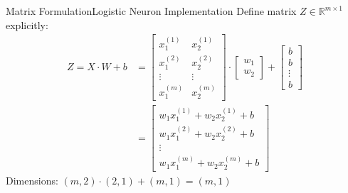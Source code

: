 \documentclass[aspectratio=169]{beamer}
\begin{document}
%
%
\begin{frame}{Matrix Formulation}{Logistic Neuron Implementation}
Define matrix $Z \in \mathbb{R}^{m \times 1}$ explicitly:
\vspace{0.5cm}
\begin{align*}
Z = X \cdot W + b &= \begin{bmatrix}
x_1^{(1)} & x_2^{(1)} \\
x_1^{(2)} & x_2^{(2)} \\
\vdots & \vdots \\
x_1^{(m)} & x_2^{(m)}
\end{bmatrix}
\cdot
\begin{bmatrix}
w_1 \\
w_2
\end{bmatrix}
+
\begin{bmatrix}
b \\
b \\
\vdots \\
b
\end{bmatrix} \\
&= \begin{bmatrix}
w_1 x_1^{(1)} + w_2 x_2^{(1)} + b \\
w_1 x_1^{(2)} + w_2 x_2^{(2)} + b \\
\vdots \\
w_1 x_1^{(m)} + w_2 x_2^{(m)} + b
\end{bmatrix}
\end{align*}
Dimensions: $(m,2)\cdot(2,1)+(m,1)=(m,1)$
\end{frame}
%
%
\end{document}
